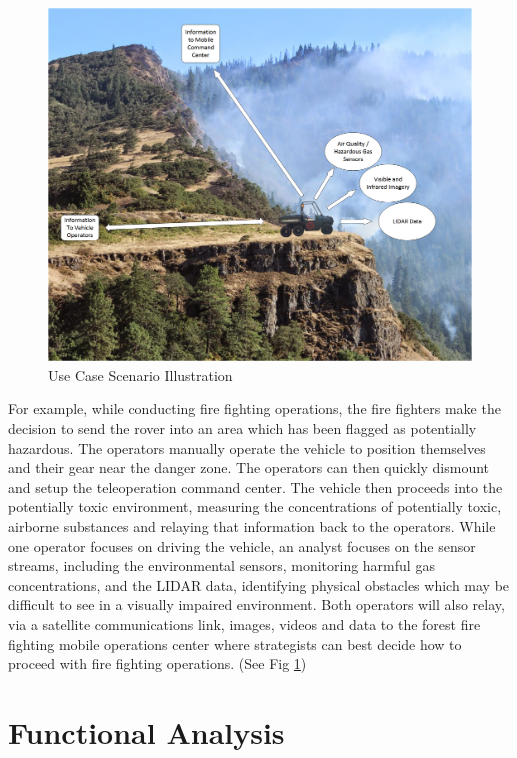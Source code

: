 \begin{figure}[H]
\centering
\includegraphics[width=0.75\linewidth]{UseCaseIllustration}
\caption{Use Case Scenario Illustration}
\label{fig:usecase}
\end{figure}
For example, while conducting fire fighting operations, the fire fighters make the decision to send the rover into an area which has been flagged as potentially hazardous. The operators manually operate the vehicle to position themselves and their gear near the danger zone. The operators can then quickly dismount and setup the teleoperation command center. The vehicle then proceeds into the potentially toxic environment, measuring the concentrations of potentially toxic, airborne substances and relaying that information back to the operators. While one operator focuses on driving the vehicle, an analyst focuses on the sensor streams, including the environmental sensors, monitoring harmful gas concentrations, and the LIDAR data, identifying physical obstacles which may be difficult to see in a visually impaired environment. Both operators will also relay, via a satellite communications link, images, videos and data to the forest fire fighting mobile operations center where strategists can best decide how to proceed with fire fighting operations. (See Fig \ref{fig:usecase})
%
\section{Functional Analysis}

